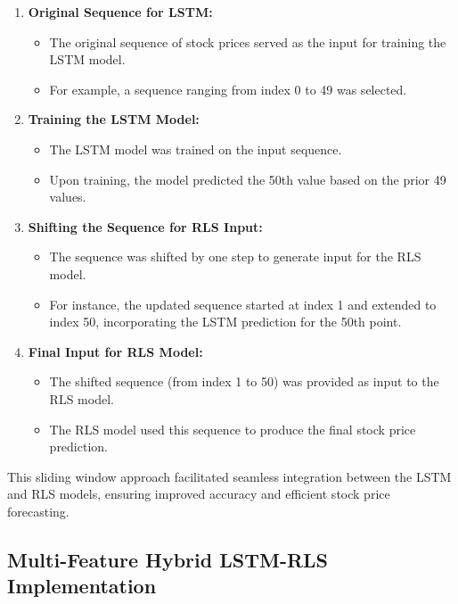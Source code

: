 \begin{enumerate}
    \item \textbf{Original Sequence for LSTM:}
    \begin{itemize}
        \item The original sequence of stock prices served as the input for training the LSTM model.
        \item For example, a sequence ranging from index 0 to 49 was selected.
    \end{itemize}
    
    \item \textbf{Training the LSTM Model:}
    \begin{itemize}
        \item The LSTM model was trained on the input sequence.
        \item Upon training, the model predicted the 50th value based on the prior 49 values.
    \end{itemize}
    
    \item \textbf{Shifting the Sequence for RLS Input:}
    \begin{itemize}
        \item The sequence was shifted by one step to generate input for the RLS model.
        \item For instance, the updated sequence started at index 1 and extended to index 50, incorporating the LSTM prediction for the 50th point.
    \end{itemize}
    
    \item \textbf{Final Input for RLS Model:}
    \begin{itemize}
        \item The shifted sequence (from index 1 to 50) was provided as input to the RLS model.
        \item The RLS model used this sequence to produce the final stock price prediction.
    \end{itemize}
\end{enumerate}

This sliding window approach facilitated seamless integration between the LSTM and RLS models, ensuring improved accuracy and efficient stock price forecasting.

\subsection{Multi-Feature Hybrid LSTM-RLS Implementation}

